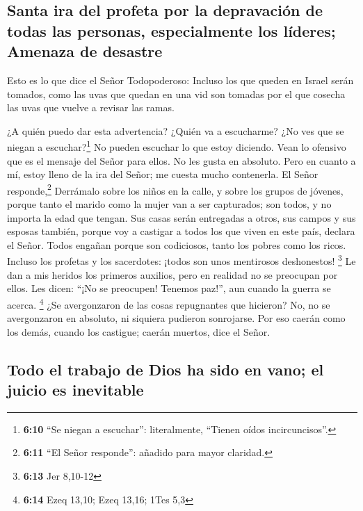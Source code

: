 \hypertarget{santa-ira-del-profeta-por-la-depravaciuxf3n-de-todas-las-personas-especialmente-los-luxedderes-amenaza-de-desastre}{%
\subsection{Santa ira del profeta por la depravación de todas las
personas, especialmente los líderes; Amenaza de
desastre}\label{santa-ira-del-profeta-por-la-depravaciuxf3n-de-todas-las-personas-especialmente-los-luxedderes-amenaza-de-desastre}}

 Esto es lo que dice el Señor Todopoderoso: Incluso los
que queden en Israel serán tomados, como las uvas que quedan en una vid
son tomadas por el que cosecha las uvas que vuelve a revisar las ramas.

 ¿A quién puedo dar esta advertencia? ¿Quién va a
escucharme? ¿No ves que se niegan a escuchar?\footnote{\textbf{6:10}
  ``Se niegan a escuchar'': literalmente, ``Tienen oídos
  incircuncisos''.} No pueden escuchar lo que estoy diciendo. Vean lo
ofensivo que es el mensaje del Señor para ellos. No les gusta en
absoluto.  Pero en cuanto a mí, estoy lleno de la ira del
Señor; me cuesta mucho contenerla. El Señor responde,\footnote{\textbf{6:11}
  ``El Señor responde'': añadido para mayor claridad.} Derrámalo sobre
los niños en la calle, y sobre los grupos de jóvenes, porque tanto el
marido como la mujer van a ser capturados; son todos, y no importa la
edad que tengan.  Sus casas serán entregadas a otros, sus
campos y sus esposas también, porque voy a castigar a todos los que
viven en este país, declara el Señor.  Todos engañan
porque son codiciosos, tanto los pobres como los ricos. Incluso los
profetas y los sacerdotes: ¡todos son unos mentirosos deshonestos!
\footnote{\textbf{6:13} Jer 8,10-12}  Le dan a mis
heridos los primeros auxilios, pero en realidad no se preocupan por
ellos. Les dicen: ``¡No se preocupen! Tenemos paz!'', aun cuando la
guerra se acerca. \footnote{\textbf{6:14} Ezeq 13,10; Ezeq 13,16; 1Tes
  5,3}  ¿Se avergonzaron de las cosas repugnantes que
hicieron? No, no se avergonzaron en absoluto, ni siquiera pudieron
sonrojarse. Por eso caerán como los demás, cuando los castigue; caerán
muertos, dice el Señor.

\hypertarget{todo-el-trabajo-de-dios-ha-sido-en-vano-el-juicio-es-inevitable}{%
\subsection{Todo el trabajo de Dios ha sido en vano; el juicio es
inevitable}\label{todo-el-trabajo-de-dios-ha-sido-en-vano-el-juicio-es-inevitable}}

